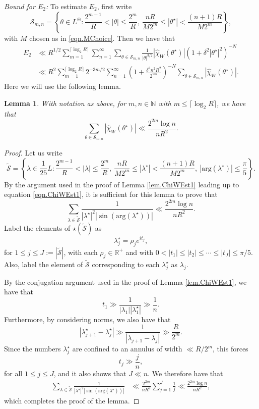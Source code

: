 \documentclass[reqno]{amsart}
\newcommand{\N}{\mathbb{N}}
\newcommand{\R}{\mathbb{R}}
\newcommand{\mc}{\mathcal}
\newcommand{\mr}{\mathrm}
\newtheorem{lemma}[theorem]{Lemma}
\begin{document}
\noindent\emph{Bound for $E_2$:} To estimate $E_2$, first write
\[\mc{S}_{m,n}=\left\{\theta\in L^\circledast :  \frac{2^{m-1}}{R}<|\theta|\le\frac{2^m}{R},~\frac{nR}{M2^m}\le|\theta^\star|<\frac{(n+1)R}{M2^m}\right\},\]
with $M$ chosen as in \eqref{eqn.MChoice}. Then we have that
\begin{align}
	E_2&\ll R^{1/2}\sum_{m=1}^{\lceil \log_2R\rceil}\sum_{n=1}^\infty\sum_{\theta\in\mc{S}_{m,n}}\frac{1}{|\theta|^{3/2}}|\widehat{\chi}_W(\theta^\star)|\left(1+\delta^2|\theta^\star|^2\right)^{-N}\nonumber\\
	&\ll R^2 \sum_{m=1}^{\lceil\log_2R\rceil}2^{-3m/2}\sum_{n=1}^\infty\left(1+\frac{\delta^2n^2R^2}{2^{2m}}\right)^{-N}\sum_{\theta\in\mc{S}_{m,n}}|\widehat{\chi}_W(\theta^\star)|.\label{eqn.E2Bound1}
\end{align}
Here we will use the following lemma.
\begin{lemma}\label{lem.ChiWEst2}
	With notation as above, for $m,n\in\N$ with $m\le\lceil \log_2R\rceil$, we have that
	\[\sum_{\theta\in\mc{S}_{m,n}}|\widehat{\chi}_W(\theta^\star)|\ll\frac{2^{2m}\log n}{nR^2}.\]
\end{lemma}
\begin{proof}
	Let us write
	\[\tilde{\mc{S}}=\left\{\lambda\in \frac{1}{25}L :  \frac{2^{m-1}}{R}<|\lambda|\le\frac{2^m}{R},~\frac{nR}{M2^m}\le|\lambda^\star|<\frac{(n+1)R}{M2^m},~|\mr{arg}(\lambda^\star)|\le \frac{\pi}{5}\right\}.\]
	By the argument used in the proof of Lemma \ref{lem.ChiWEst1} leading up to equation \eqref{eqn.ChiWEst1}, it is sufficient for this lemma to prove that
	\begin{equation*}
		\sum_{\lambda\in\tilde{\mc{S}}}\frac{1}{|\lambda^\star|^2|\sin(\mathrm{arg}(\lambda^\star))|}\ll\frac{2^{2m}\log n}{nR^2}.
	\end{equation*}
	Label the elements of $\star(\tilde{\mc{S}})$ as
	\[\lambda_j^\star=\rho_je^{it_j},\]
	for $1\le j\le J:=|\tilde{\mc{S}}|$, with each $\rho_j\in\R^+$ and with $0< |t_1|\le |t_2|\le\cdots \le |t_J|\le\pi/5$. Also, label the element of $\tilde{\mc{S}}$ corresponding to each $\lambda_j^\star$ as $\lambda_j$.
	
	By the conjugation argument used in the proof of Lemma \ref{lem.ChiWEst1}, we have that
	\[t_1\gg \frac{1}{|\lambda_1||\lambda_1^\star|}\gg\frac{1}{n}.\]
	Furthermore, by considering norms, we also have that
	\[|\lambda_{j+1}^\star-\lambda_{j}^\star|\gg \frac{1}{|\lambda_{j+1}-\lambda_j|}\gg\frac{R}{2^m}.\]
	Since the numbers $\lambda_j^\star$ are confined to an annulus of width $\ll R/2^m$, this forces
	\[t_j\gg\frac{j}{n},\]
	for all $1\le j\le J$, and it also shows that $J\ll n$. We therefore have that
	\begin{align*}
		\sum_{\lambda\in\tilde{\mc{S}}}\frac{1}{|\lambda^\star|^2|\sin(\mathrm{arg}(\lambda^\star))|}&\ll\frac{2^{2m}}{nR^2}\sum_{j=1}^J\frac{1}{j}\ll\frac{2^{2m}\log n}{nR^2},
	\end{align*}
	which completes the proof of the lemma.
\end{proof}
\end{document}
